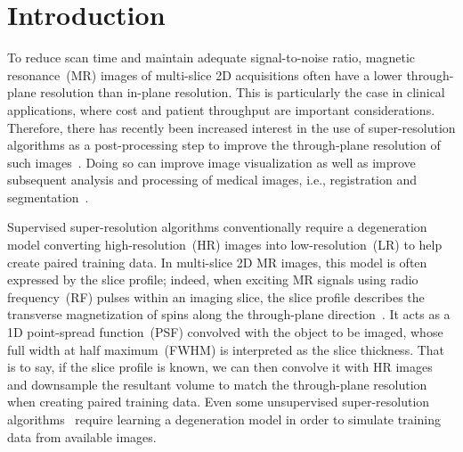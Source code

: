 \documentclass[runningheads]{llncs}
\begin{document}
\section{Introduction}
%
To reduce scan time and maintain adequate signal-to-noise ratio,
magnetic resonance~(MR) images of multi-slice 2D acquisitions often
have a lower through-plane resolution than in-plane resolution. This
is particularly the case in clinical applications, where cost and
patient throughput are important considerations. Therefore, there has
recently been increased interest in the use of super-resolution
algorithms as a post-processing step to improve the through-plane
resolution of such images~\cite{xuan-2020-arxiv, zhao-2018-smore,
weigert-2017-fm}. Doing so can improve image visualization as well as
improve subsequent analysis and processing of medical images, i.e.,
registration and segmentation~\cite{zhao-2019-applications}.

Supervised super-resolution algorithms conventionally require a
degeneration model converting high-resolution~(HR) images into
low-resolution~(LR) to help create paired training data. In
multi-slice 2D MR images, this model is often expressed by the slice
profile; indeed, when exciting MR signals using radio frequency~(RF)
pulses within an imaging slice, the slice profile describes the
transverse magnetization of spins along the through-plane
direction~\cite{prince-2006-book}. It acts as a 1D point-spread
function~(PSF) convolved with the object to be imaged, whose full
width at half maximum~(FWHM) is interpreted as the slice thickness.
That is to say, if the slice profile is known, we can then convolve it
with HR images and downsample the resultant volume to match the
through-plane resolution when creating paired training data. Even some
unsupervised super-resolution algorithms~\cite{chen-2020-indirect}
require learning a degeneration model in order to simulate training
data from available images.
\end{document}
